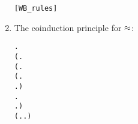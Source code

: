 \begin{enumerate}
\begin{small}
\begin{alltt}
        \HOLSymConst{\HOLTokenWeakEQ} \hfill{[WB_rules]}
\end{alltt}
\end{small}
\item The coinduction principle for $\approx$:
\begin{small}
\begin{alltt}
\HOLTokenTurnstile{} \HOLSymConst{\HOLTokenForall{}}.
       (\HOLSymConst{\HOLTokenForall{}} .
               \HOLSymConst{\HOLTokenImp{}}
            (\HOLSymConst{\HOLTokenForall{}}.
                 (\HOLSymConst{\HOLTokenForall{}}.
                       \HOLTokenTransBegin{} \HOLTokenTransEnd {} \HOLSymConst{\HOLTokenImp{}}
                      \HOLSymConst{\HOLTokenExists{}}.  \HOLTokenWeakTransBegin{} \HOLTokenWeakTransEnd {} \HOLSymConst{\HOLTokenConj{}}   ) \HOLSymConst{\HOLTokenConj{}}
                 \HOLSymConst{\HOLTokenForall{}}.
                      \HOLTokenTransBegin{} \HOLTokenTransEnd {} \HOLSymConst{\HOLTokenImp{}}
                     \HOLSymConst{\HOLTokenExists{}}.  \HOLTokenWeakTransBegin{} \HOLTokenWeakTransEnd {} \HOLSymConst{\HOLTokenConj{}}   ) \HOLSymConst{\HOLTokenConj{}}
            (\HOLSymConst{\HOLTokenForall{}}.  \HOLTokenTransBegin\HOLSymConst{\ensuremath{\tau}}\HOLTokenTransEnd {} \HOLSymConst{\HOLTokenImp{}} \HOLSymConst{\HOLTokenExists{}}.  \HOLSymConst{\HOLTokenEPS}  \HOLSymConst{\HOLTokenConj{}}   ) \HOLSymConst{\HOLTokenConj{}}

\end{alltt}
\end{small}
\end{enumerate}
